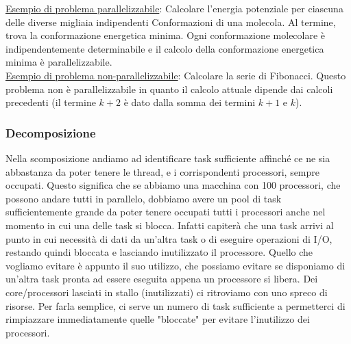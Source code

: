 \underline{Esempio di problema parallelizzabile}: Calcolare l'energia potenziale per ciascuna delle diverse migliaia indipendenti Conformazioni di una molecola. Al termine, trova la conformazione energetica minima. Ogni conformazione molecolare è indipendentemente determinabile e il calcolo della conformazione energetica minima è parallelizzabile.
\\

\underline{Esempio di problema non-parallelizzabile}: Calcolare la serie di Fibonacci. Questo problema non è parallelizzabile in quanto il calcolo attuale dipende dai calcoli precedenti (il termine $k+2$ è dato dalla somma dei termini $k+1$ e $k$). 
\\



\subsubsection{Decomposizione}
Nella scomposizione andiamo ad identificare task sufficiente affinché ce ne sia abbastanza da poter tenere le thread, e i corrispondenti processori, sempre occupati. Questo significa che se abbiamo una macchina con 100 processori, che possono andare tutti in parallelo, dobbiamo avere un pool di task sufficientemente grande da poter tenere occupati tutti i processori anche nel momento in cui una delle task si blocca. Infatti capiterà che una task arrivi al punto in cui necessità di dati da un'altra task o di eseguire operazioni di I/O, restando quindi bloccata e lasciando inutilizzato il processore. Quello che vogliamo evitare è appunto il suo utilizzo, che possiamo evitare se disponiamo di un'altra task pronta ad essere eseguita appena un processore si libera. Dei core/processori lasciati in stallo (inutilizzati) ci ritroviamo con uno spreco di risorse.
Per farla semplice, ci serve un numero di task sufficiente a permetterci di rimpiazzare immediatamente quelle "bloccate" per evitare l'inutilizzo dei processori.

